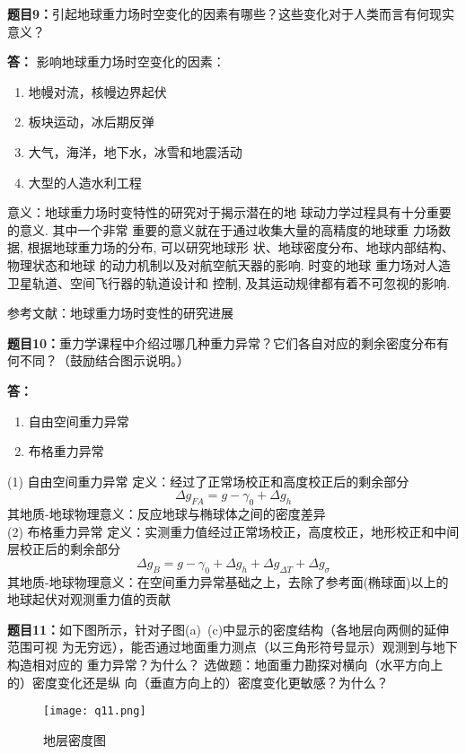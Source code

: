 \documentclass[12pt,a4paper]{article}
\begin{document}
\vspace{10pt}
\noindent
{\bf 题目9：}引起地球重力场时空变化的因素有哪些？这些变化对于人类而言有何现实意义？

\vspace{5pt}
\noindent
{\bf 答：} 影响地球重力场时空变化的因素：
\begin{enumerate}[label=(\arabic*)] %
    \item 地幔对流，核幔边界起伏
    \item 板块运动，冰后期反弹
    \item 大气，海洋，地下水，冰雪和地震活动
    \item 大型的人造水利工程
\end{enumerate}

意义：地球重力场时变特性的研究对于揭示潜在的地
球动力学过程具有十分重要的意义. 其中一个非常
重要的意义就在于通过收集大量的高精度的地球重
力场数据, 根据地球重力场的分布, 可以研究地球形
状、地球密度分布、地球内部结构、物理状态和地球
的动力机制以及对航空航天器的影响. 时变的地球
重力场对人造卫星轨道、空间飞行器的轨道设计和
控制, 及其运动规律都有着不可忽视的影响.

参考文献：地球重力场时变性的研究进展


\vspace{10pt}
\noindent
{\bf 题目10：}重力学课程中介绍过哪几种重力异常？它们各自对应的剩余密度分布有何不同？（鼓励结合图示说明。）

\vspace{5pt}
\noindent
{\bf 答：} 
\begin{enumerate}[label=(\arabic*)] %
    \item 自由空间重力异常
    \item 布格重力异常
\end{enumerate}
(1) 自由空间重力异常
定义：经过了正常场校正和高度校正后的剩余部分
\begin{equation}
    \Delta g_{FA} = g - \gamma_0 + \Delta g_h
\end{equation}
其地质-地球物理意义：反应地球与椭球体之间的密度差异 \\
(2) 布格重力异常
定义：实测重力值经过正常场校正，高度校正，地形校正和中间层校正后的剩余部分
\begin{equation}
    \Delta g_B = g - \gamma_0 + \Delta g_h + \Delta g_{\Delta T} + \Delta g_{\sigma}
\end{equation}
其地质-地球物理意义：在空间重力异常基础之上，去除了参考面(椭球面)以上的地球起伏对观测重力值的贡献

\vspace{10pt}
\noindent
{\bf 题目11：}如下图所示，针对子图(a)~(c)中显示的密度结构（各地层向两侧的延伸范围可视
为无穷远），能否通过地面重力测点（以三角形符号显示）观测到与地下构造相对应的
重力异常？为什么？ 选做题：地面重力勘探对横向（水平方向上的）密度变化还是纵
向（垂直方向上的）密度变化更敏感？为什么？
\begin{figure}[H] %
    \centering %
    \texttt{[image: q11.png]} %
    \caption{地层密度图} %
    \label{Fig.main2} %
\end{figure}
\end{document}
